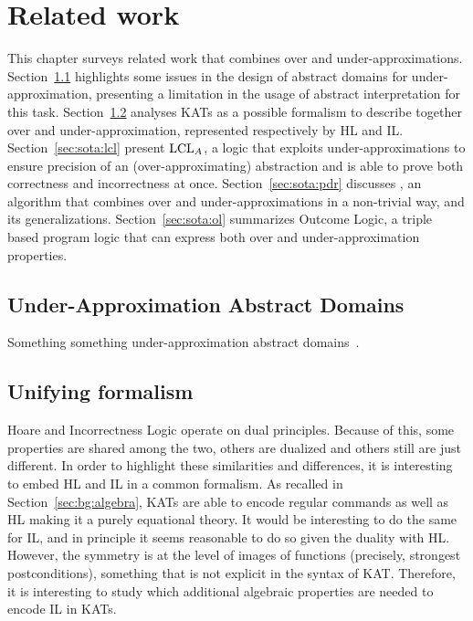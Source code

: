 
\chapter{Related work}\label{ch:sota}
This chapter surveys related work that combines over and under-approximations.
Section~\ref{sec:sota:limits-underapprox-domains} highlights some issues in the design of abstract domains for under-approximation, presenting a limitation in the usage of abstract interpretation for this task.
Section~\ref{sec:sota:kat} analyses KATs as a possible formalism to describe together over and under-approximation, represented respectively by HL and IL.
Section~\ref{sec:sota:lcl} present $\text{LCL}_A$, a logic that exploits under-approximations to ensure precision of an (over-approximating) abstraction and is able to prove both correctness and incorrectness at once.
Section~\ref{sec:sota:pdr} discusses , an algorithm that combines over and under-approximations in a non-trivial way, and its generalizations.
Section~\ref{sec:sota:ol} summarizes Outcome Logic, a triple based program logic that can express both over and under-approximation properties.

\section{Under-Approximation Abstract Domains}\label{sec:sota:limits-underapprox-domains}
Something something under-approximation abstract domains~\cite{ABG22,ABG24}.

\section{Unifying formalism}\label{sec:sota:kat}
Hoare and Incorrectness Logic operate on dual principles. Because of this, some properties are shared among the two, others are dualized and others still are just different. In order to highlight these similarities and differences, it is interesting to embed HL and IL in a common formalism. As recalled in Section~\ref{sec:bg:algebra}, KATs are able to encode regular commands \cite{Kozen97} as well as HL \cite{Kozen00} making it a purely equational theory.
It would be interesting to do the same for IL, and in principle it seems reasonable to do so given the duality with HL. However, the symmetry is at the level of images of functions (precisely, strongest postconditions), something that is not explicit in the syntax of KAT. Therefore, it is interesting to study which additional algebraic properties are needed to encode IL in KATs.

